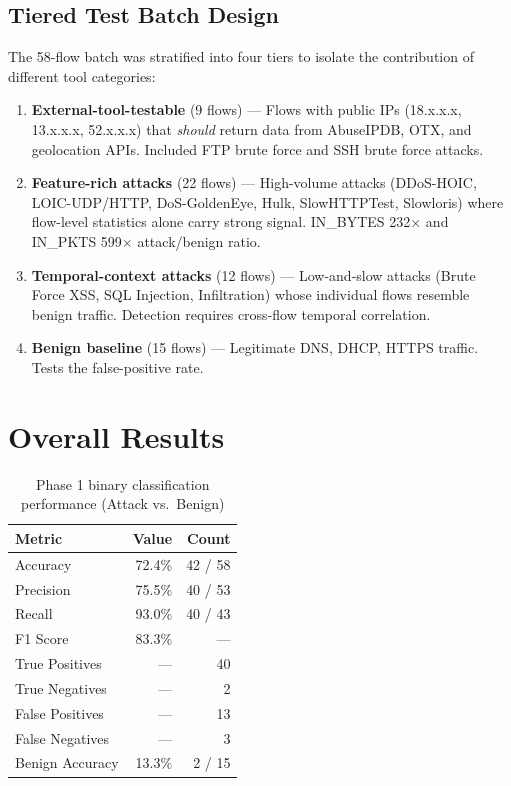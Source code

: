 \documentclass[12pt, a4paper, oneside]{report}
\begin{document}
\subsection{Tiered Test Batch Design}

The 58-flow batch was stratified into four tiers to isolate the contribution of
different tool categories:

\begin{enumerate}[label=\textbf{Tier \arabic*:}, leftmargin=3.5em]
  \item \textbf{External-tool-testable} (9 flows) --- Flows with public IPs
        (18.x.x.x, 13.x.x.x, 52.x.x.x) that \emph{should} return data from
        AbuseIPDB, OTX, and geolocation APIs. Included FTP brute force and SSH
        brute force attacks.
  \item \textbf{Feature-rich attacks} (22 flows) --- High-volume attacks
        (DDoS-HOIC, LOIC-UDP/HTTP, DoS-GoldenEye, Hulk, SlowHTTPTest,
        Slowloris) where flow-level statistics alone carry strong signal.
        IN\_BYTES 232$\times$ and IN\_PKTS 599$\times$ attack/benign ratio.
  \item \textbf{Temporal-context attacks} (12 flows) --- Low-and-slow attacks
        (Brute Force XSS, SQL Injection, Infiltration) whose individual flows
        resemble benign traffic. Detection requires cross-flow temporal
        correlation.
  \item \textbf{Benign baseline} (15 flows) --- Legitimate DNS, DHCP, HTTPS
        traffic. Tests the false-positive rate.
\end{enumerate}


\section{Overall Results}
\label{sec:phase1-results}

\begin{table}[H]
\centering
\caption{Phase 1 binary classification performance (Attack vs.\ Benign)}
\label{tab:phase1-overall}
\begin{tabular}{@{}lrr@{}}
\toprule
\textbf{Metric} & \textbf{Value} & \textbf{Count} \\
\midrule
Accuracy   & 72.4\% & 42 / 58 \\
Precision  & 75.5\% & 40 / 53 \\
Recall     & 93.0\% & 40 / 43 \\
F1 Score   & 83.3\% & --- \\
\midrule
True Positives  & --- & 40 \\
True Negatives  & --- & 2 \\
False Positives & --- & 13 \\
False Negatives & --- & 3 \\
\midrule
Benign Accuracy & 13.3\% & 2 / 15 \\
\bottomrule
\end{tabular}
\end{table}
\end{document}
